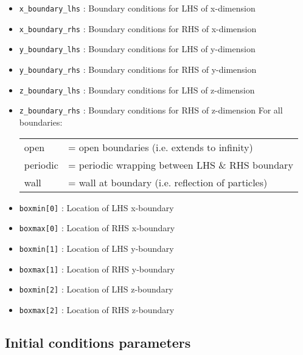 \documentclass[a4paper]{article}
\newcommand{\var}[1]{\texttt{#1}}
\begin{document}
\begin{itemize}

\item \var{x\_boundary\_lhs} : Boundary conditions for LHS of x-dimension
\item \var{x\_boundary\_rhs} : Boundary conditions for RHS of x-dimension
\item \var{y\_boundary\_lhs} : Boundary conditions for LHS of y-dimension
\item \var{y\_boundary\_rhs} : Boundary conditions for RHS of y-dimension
\item \var{z\_boundary\_lhs} : Boundary conditions for LHS of z-dimension
\item \var{z\_boundary\_rhs} : Boundary conditions for RHS of z-dimension
For all boundaries: \\
\begin{tabular}{ll}
open     & = open boundaries (i.e. extends to infinity) \\
periodic & = periodic wrapping between LHS \& RHS boundary \\
wall     & = wall at boundary (i.e. reflection of particles)
\end{tabular}

\item \var{boxmin[0]} : Location of LHS x-boundary
\item \var{boxmax[0]} : Location of RHS x-boundary
\item \var{boxmin[1]} : Location of LHS y-boundary
\item \var{boxmax[1]} : Location of RHS y-boundary
\item \var{boxmin[2]} : Location of LHS z-boundary
\item \var{boxmax[2]} : Location of RHS z-boundary


\end{itemize}



\subsection{Initial conditions parameters}
\end{document}

